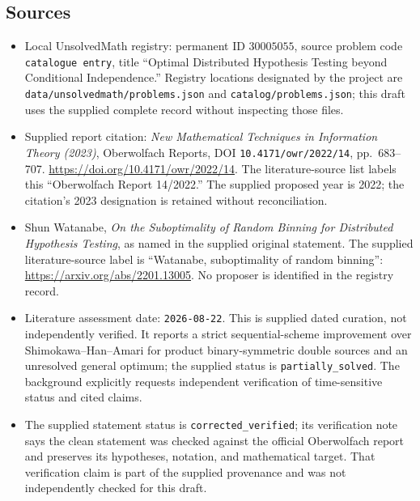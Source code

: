 \documentclass[11pt]{article}
\begin{document}
\subsection{Sources}
\begin{itemize}
\item Local UnsolvedMath registry: permanent ID \(30005055\), source problem code \texttt{catalogue entry}, title ``Optimal Distributed Hypothesis Testing beyond Conditional Independence.'' Registry locations designated by the project are \texttt{data/unsolvedmath/problems.json} and \texttt{catalog/problems.json}; this draft uses the supplied complete record without inspecting those files.
\item Supplied report citation: \emph{New Mathematical Techniques in Information Theory (2023)}, Oberwolfach Reports, DOI \texttt{10.4171/owr/2022/14}, pp.\ 683--707. \url{https://doi.org/10.4171/owr/2022/14}. The literature-source list labels this ``Oberwolfach Report 14/2022.'' The supplied proposed year is 2022; the citation's 2023 designation is retained without reconciliation.
\item Shun Watanabe, \emph{On the Suboptimality of Random Binning for Distributed Hypothesis Testing}, as named in the supplied original statement. The supplied literature-source label is ``Watanabe, suboptimality of random binning'': \url{https://arxiv.org/abs/2201.13005}. No proposer is identified in the registry record.
\item Literature assessment date: \texttt{2026-08-22}. This is supplied dated curation, not independently verified. It reports a strict sequential-scheme improvement over Shimokawa--Han--Amari for product binary-symmetric double sources and an unresolved general optimum; the supplied status is \texttt{partially\_solved}. The background explicitly requests independent verification of time-sensitive status and cited claims.
\item The supplied statement status is \texttt{corrected\_verified}; its verification note says the clean statement was checked against the official Oberwolfach report and preserves its hypotheses, notation, and mathematical target. That verification claim is part of the supplied provenance and was not independently checked for this draft.
\end{itemize}
\end{document}
